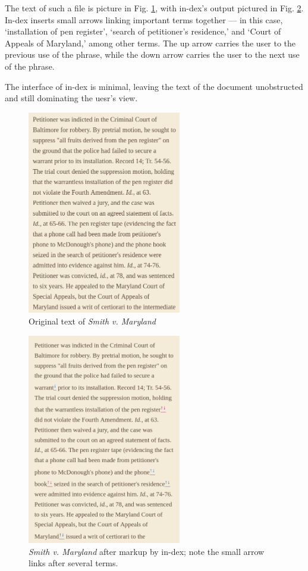 \documentclass[12pt]{article}
\begin{document}
	The text of such a file is picture in Fig. \ref{html}, with in-dex’s output
	pictured in Fig. \ref{idx}. In-dex inserts small arrows linking important
	terms together --- in this case, ‘installation of pen register’, ‘search of
	petitioner’s residence,’ and ‘Court of Appeals of Maryland,’ among other
	terms. The up arrow carries the user to the previous use of the phrase,
	while the down arrow carries the user to the next use of the phrase.

	The interface of in-dex is minimal, leaving the text of the document
	unobstructed and still dominating the uesr’s view.

	\begin{figure}[h]
		\center
		\includegraphics[width=0.6\textwidth]{html.png}
		\caption{Original text of \emph{Smith v. Maryland}\autocite{smith}}
		\label{html}
	\end{figure}
	\begin{figure}[h]
		\center
		\includegraphics[width=0.6\textwidth]{idx.png}
		\caption{\emph{Smith v. Maryland}\autocite{smith} after markup by in-dex; note the small arrow links after several terms.}
		\label{idx}
	\end{figure}
		
\end{document}
